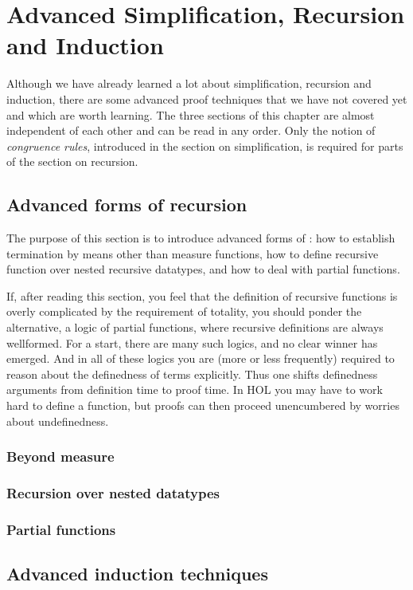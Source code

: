 \chapter{Advanced Simplification, Recursion and Induction}

Although we have already learned a lot about simplification, recursion and
induction, there are some advanced proof techniques that we have not covered
yet and which are worth learning. The three sections of this chapter are almost
independent of each other and can be read in any order. Only the notion of
\emph{congruence rules}, introduced in the section on simplification, is
required for parts of the section on recursion.



\section{Advanced forms of recursion}

The purpose of this section is to introduce advanced forms of
: how to establish termination by means other than measure
functions, how to define recursive function over nested recursive datatypes,
and how to deal with partial functions.

If, after reading this section, you feel that the definition of recursive
functions is overly complicated by the requirement of
totality, you should ponder the alternative, a logic of partial functions,
where recursive definitions are always wellformed. For a start, there are many
such logics, and no clear winner has emerged. And in all of these logics you
are (more or less frequently) required to reason about the definedness of
terms explicitly. Thus one shifts definedness arguments from definition time to
proof time. In HOL you may have to work hard to define a function, but proofs
can then proceed unencumbered by worries about undefinedness.

\subsection{Beyond measure}
\label{sec:beyond-measure}


\subsection{Recursion over nested datatypes}
\label{sec:nested-recdef}




\subsection{Partial functions}



\section{Advanced induction techniques}
\label{sec:advanced-ind}


